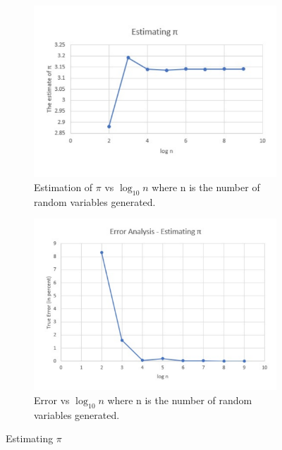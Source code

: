 \documentclass[titlepage, 11pt]{article}
\begin{document}
\begin{figure}[ht]
\begin{subfigure}{.5\textwidth}
  \centering
  \includegraphics[width=\linewidth]{PI.pdf}
  \caption{Estimation of {$\pi$ vs $\log_{10}n$} where n is the number of random variables generated.}
  \label{fig:fig5a}
\end{subfigure}
\begin{subfigure}{.5\textwidth}
  \centering
  \includegraphics[width=\linewidth]{EA_PI.pdf}
  \caption{Error vs ${\log_{10}{n}}$ where n is the number of random variables generated.}
  \label{fig:fig5b}
\end{subfigure}
\caption{Estimating $\pi$}
\label{fig:q11}
\end{figure}
\end{document}
